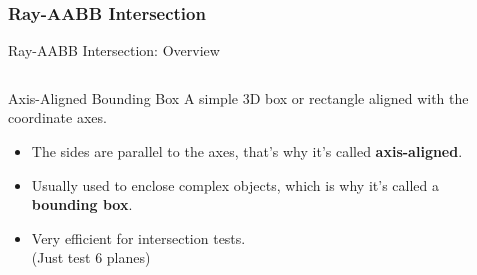 \subsubsection{Ray-AABB Intersection}
\begin{frame}{Ray-AABB Intersection: Overview}
    \begin{columns}
        \begin{column}{0.65\textwidth}
            \begin{conceptbox}{Axis-Aligned Bounding Box}
                A simple 3D box or rectangle aligned with the coordinate axes.
                \begin{itemize}
                    \item The sides are parallel to the axes, that's why it's called \textbf{axis-aligned}.
                    \item Usually used to enclose complex objects, which is why it's called a \textbf{bounding box}.
                    \item Very efficient for intersection tests. \\
                          (Just test 6 planes)
                \end{itemize}
            \end{conceptbox}
        \end{column}
        \begin{column}{0.35\textwidth}
\end{column}
\end{columns}
\end{frame}
